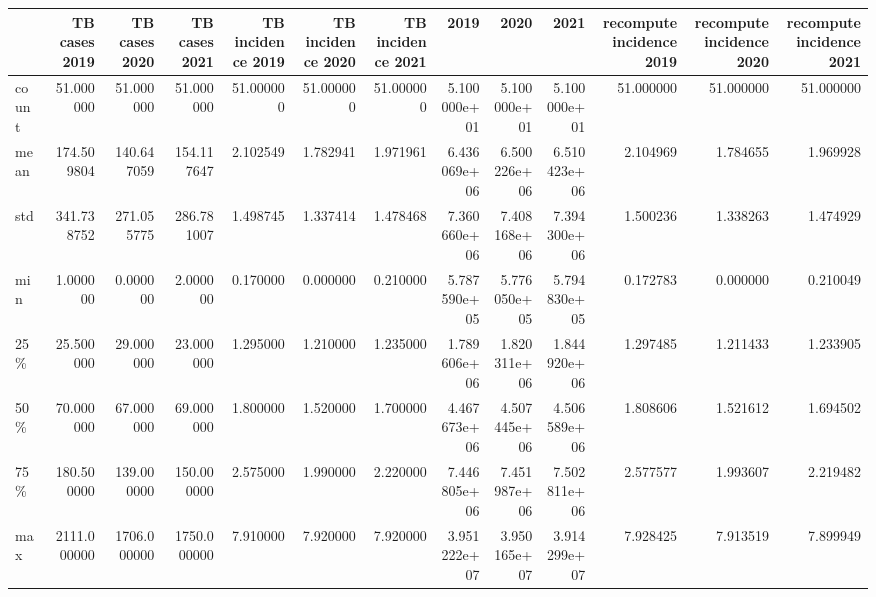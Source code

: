 \documentclass[
  letterpaper,
  DIV=11,
  numbers=noendperiod]{scrreprt}
\begin{document}
\begin{tabular}{lrrrrrrrrrrrr}
\toprule
{} &  TB cases 2019 &  TB cases 2020 &  TB cases 2021 &  TB incidence 2019 &  TB incidence 2020 &  TB incidence 2021 &          2019 &          2020 &          2021 &  recompute incidence 2019 &  recompute incidence 2020 &  recompute incidence 2021 \\
\midrule
count &      51.000000 &      51.000000 &      51.000000 &          51.000000 &          51.000000 &          51.000000 &  5.100000e+01 &  5.100000e+01 &  5.100000e+01 &                 51.000000 &                 51.000000 &                 51.000000 \\
mean  &     174.509804 &     140.647059 &     154.117647 &           2.102549 &           1.782941 &           1.971961 &  6.436069e+06 &  6.500226e+06 &  6.510423e+06 &                  2.104969 &                  1.784655 &                  1.969928 \\
std   &     341.738752 &     271.055775 &     286.781007 &           1.498745 &           1.337414 &           1.478468 &  7.360660e+06 &  7.408168e+06 &  7.394300e+06 &                  1.500236 &                  1.338263 &                  1.474929 \\
min   &       1.000000 &       0.000000 &       2.000000 &           0.170000 &           0.000000 &           0.210000 &  5.787590e+05 &  5.776050e+05 &  5.794830e+05 &                  0.172783 &                  0.000000 &                  0.210049 \\
25\%   &      25.500000 &      29.000000 &      23.000000 &           1.295000 &           1.210000 &           1.235000 &  1.789606e+06 &  1.820311e+06 &  1.844920e+06 &                  1.297485 &                  1.211433 &                  1.233905 \\
50\%   &      70.000000 &      67.000000 &      69.000000 &           1.800000 &           1.520000 &           1.700000 &  4.467673e+06 &  4.507445e+06 &  4.506589e+06 &                  1.808606 &                  1.521612 &                  1.694502 \\
75\%   &     180.500000 &     139.000000 &     150.000000 &           2.575000 &           1.990000 &           2.220000 &  7.446805e+06 &  7.451987e+06 &  7.502811e+06 &                  2.577577 &                  1.993607 &                  2.219482 \\
max   &    2111.000000 &    1706.000000 &    1750.000000 &           7.910000 &           7.920000 &           7.920000 &  3.951222e+07 &  3.950165e+07 &  3.914299e+07 &                  7.928425 &                  7.913519 &                  7.899949 \\
\bottomrule
\end{tabular}
\end{document}
